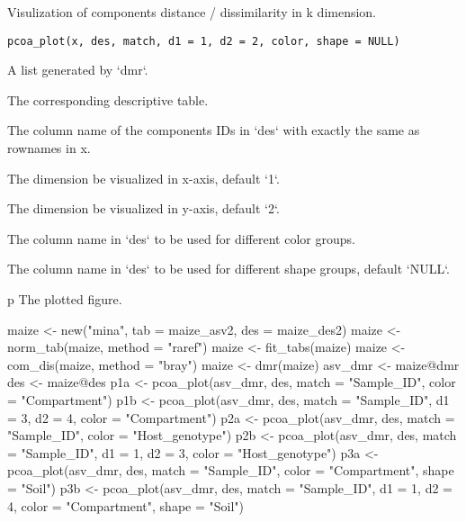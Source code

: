 \documentclass[a4paper]{book}
\begin{document}
%
\begin{Description}\relax
Visulization of components distance / dissimilarity in k dimension.
\end{Description}
%
\begin{Usage}
\begin{verbatim}
pcoa_plot(x, des, match, d1 = 1, d2 = 2, color, shape = NULL)
\end{verbatim}
\end{Usage}
%
\begin{Arguments}
\begin{ldescription}
\item[\code{x}] A list generated by `dmr`.

\item[\code{des}] The corresponding descriptive table.

\item[\code{match}] The column name of the components IDs in `des` with exactly the
same as rownames in x.

\item[\code{d1}] The dimension be visualized in x-axis, default `1`.

\item[\code{d2}] The dimension be visualized in y-axis, default `2`.

\item[\code{color}] The column name in `des` to be used for different color groups.

\item[\code{shape}] The column name in `des` to be used for different shape groups,
default `NULL`.
\end{ldescription}
\end{Arguments}
%
\begin{Value}
p The plotted figure.
\end{Value}
%
\begin{Examples}
\begin{ExampleCode}
maize <- new("mina", tab = maize_asv2, des = maize_des2)
maize <- norm_tab(maize, method = "raref")
maize <- fit_tabs(maize)
maize <- com_dis(maize, method = "bray")
maize <- dmr(maize)
asv_dmr <- maize@dmr
des <- maize@des
p1a <- pcoa_plot(asv_dmr, des, match = "Sample_ID", color = "Compartment")
p1b <- pcoa_plot(asv_dmr, des, match = "Sample_ID", d1 = 3, d2 = 4, color =
"Compartment")
p2a <- pcoa_plot(asv_dmr, des, match = "Sample_ID", color = "Host_genotype")
p2b <- pcoa_plot(asv_dmr, des, match = "Sample_ID", d1 = 1, d2 = 3, color =
"Host_genotype")
p3a <- pcoa_plot(asv_dmr, des, match = "Sample_ID", color = "Compartment",
shape = "Soil")
p3b <- pcoa_plot(asv_dmr, des, match = "Sample_ID", d1 = 1, d2 = 4, color =
"Compartment", shape = "Soil")
\end{ExampleCode}
\end{Examples}
\end{document}
